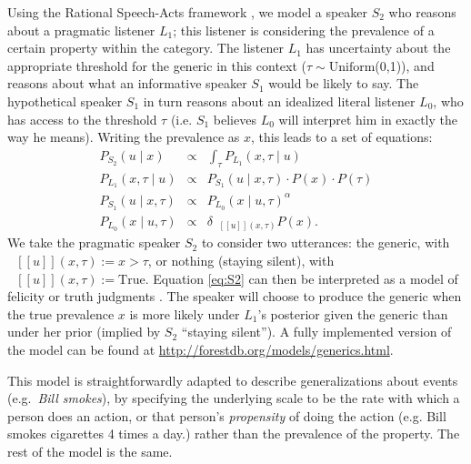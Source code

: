\documentclass[11pt,letterpaper]{article}
\newcommand{\denote}[1]{\mbox{ $[\![ #1 ]\!]$}}
\begin{document}
Using the Rational Speech-Acts framework \cite{Frank2012,Goodman2013}, 
we model a speaker $S_2$ who reasons about a pragmatic listener $L_1$; this listener is considering the prevalence of a certain property within the category.
The listener $L_1$ has uncertainty about the appropriate threshold for the generic in this context ($\tau \sim \text{Uniform}$(0,1)), and reasons about what an informative speaker $S_1$ would be likely to say. The hypothetical speaker $S_1$ in turn reasons about an idealized literal listener $L_0$, who has access to the threshold $\tau$ (i.e. $S_1$ believes $L_0$ will interpret him in exactly the way he means). 
Writing the prevalence as $x$, this leads to a set of equations:
%
\begin{eqnarray}
P_{S_{2}}(u \mid x) & \propto &  \int_{\tau} P_{L_{1}}(x , \tau \mid u) \label{eq:S2}\\
P_{L_{1}}(x , \tau \mid u) &\propto& P_{S_{1}}(u \mid x, \tau) \cdot P(x) \cdot P(\tau) \label{eq:L1}\\
P_{S_{1}}(u \mid x, \tau) &\propto&  {P_{L_{0}}(x \mid u, \tau)}^{\alpha} \label{eq:S1}\\
P_{L_{0}}(x \mid u, \tau) &\propto& {\delta_{\denote{u}(x, \tau)} P(x)}. \label{eq:L0}
\end{eqnarray}
%
We take the pragmatic speaker $S_2$ to consider two utterances: the generic, with $\denote{u}(x, \tau) := x>\tau$, or nothing (staying silent), with $\denote{u}(x, \tau) := \text{True}$.
Equation \ref{eq:S2} can then be interpreted as a model of felicity or truth judgments \cite{Degen2014, TesslerUnderReview}.
The speaker will choose to produce the generic when the true prevalence $x$ is more likely under $L_1$'s posterior given the generic than under her prior (implied by $S_2$ ``staying silent''). 
A fully implemented version of the model can be found at \url{http://forestdb.org/models/generics.html}.

This model is straightforwardly adapted to describe generalizations about events (e.g.~\emph{Bill smokes}), by specifying the underlying scale to be the rate with which a person does an action, or that person's \emph{propensity} of doing the action (e.g. Bill smokes cigarettes 4 times a day.) rather than the prevalence of the property. 
The rest of the model is the same.



 
\end{document}
